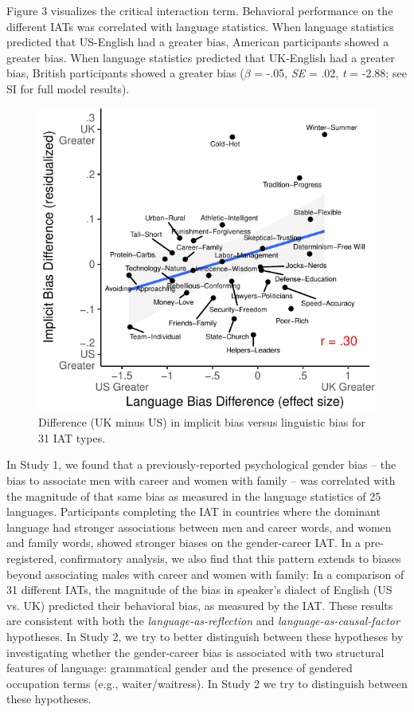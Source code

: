 \documentclass[9pt,twocolumn,twoside]{pnas-new}
\begin{document}
Figure 3 visualizes the critical interaction term. Behavioral performance on the different IATs was correlated with language statistics. When language statistics predicted that US-English had a greater bias, American participants showed a greater bias. When language statistics predicted that UK-English had a greater bias, British participants showed a greater bias (\(\beta\) = -.05, \emph{SE} = .02, \emph{t} = -2.88; see SI for full model results).

\begin{figure}
\centering
\includegraphics[width=.8\linewidth]{pnas_rmd/iat_lang_pnas_files/figure-latex/1cplot-1.pdf}
\caption{\label{fig:1cplot}Difference (UK minus US) in implicit bias
versus linguistic bias for 31 IAT types.}
\end{figure}

In Study 1, we found that a previously-reported psychological gender bias – the bias to associate men with career and women with family – was correlated with the magnitude of that same bias as measured in the language statistics of 25 languages. Participants completing the IAT in countries where the dominant language had stronger associations between men and career words, and women and family words, showed stronger biases on the gender-career IAT. In a pre-registered, confirmatory analysis, we also find that this pattern extends to biases beyond associating males with career and women with family: In a comparison of 31 different IATs, the magnitude of the bias in speaker’s dialect of English (US vs. UK) predicted their behavioral bias, as measured by the IAT. These results are consistent with both the \emph{language-as-reflection} and
\emph{language-as-causal-factor} hypotheses. In Study 2, we try to
better distinguish between these hypotheses by investigating whether the
gender-career bias is associated with two structural features of
language: grammatical gender and the presence of gendered occupation
terms (e.g., waiter/waitress). In Study 2 we try to distinguish between these hypotheses.
\end{document}
